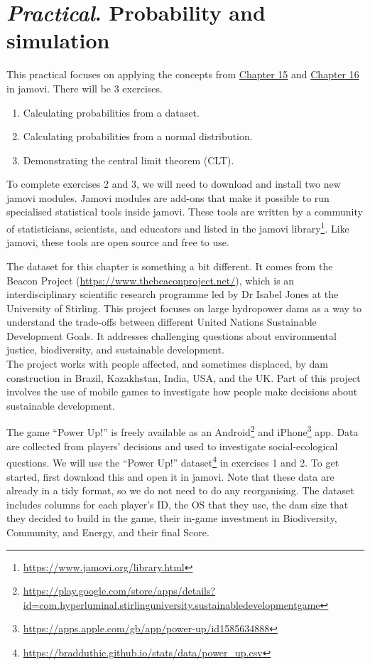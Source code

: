 \documentclass[
  openany]{krantz}
\providecommand{\tightlist}{%
  \setlength{\itemsep}{0pt}\setlength{\parskip}{0pt}}
\renewcommand{\href}[2]{#2\footnote{\url{#1}}}
\begin{document}
\hypertarget{Chapter_17}{%
\chapter{\texorpdfstring{\emph{Practical}. Probability and simulation}{Practical. Probability and simulation}}\label{Chapter_17}}

This practical focuses on applying the concepts from \protect\hyperlink{Chapter_15}{Chapter 15} and \protect\hyperlink{Chapter_16}{Chapter 16} in jamovi.
There will be 3 exercises.

\begin{enumerate}
\def\labelenumi{\arabic{enumi}.}
\tightlist
\item
  Calculating probabilities from a dataset.
\item
  Calculating probabilities from a normal distribution.
\item
  Demonstrating the central limit theorem (CLT).
\end{enumerate}

To complete exercises 2 and 3, we will need to download and install two new jamovi modules.
Jamovi modules are add-ons that make it possible to run specialised statistical tools inside jamovi.
These tools are written by a community of statisticians, scientists, and educators and listed in the \href{https://www.jamovi.org/library.html}{jamovi library}.
Like jamovi, these tools are open source and free to use.

The dataset for this chapter is something a bit different.
It comes from the Beacon Project (\url{https://www.thebeaconproject.net/}), which is an interdisciplinary scientific research programme led by Dr Isabel Jones at the University of Stirling.
This project focuses on large hydropower dams as a way to understand the trade-offs between different United Nations Sustainable Development Goals.
It addresses challenging questions about environmental justice, biodiversity, and sustainable development.\\
The project works with people affected, and sometimes displaced, by dam construction in Brazil, Kazakhstan, India, USA, and the UK.
Part of this project involves the use of mobile games to investigate how people make decisions about sustainable development.

The game ``Power Up!'' is freely available as an \href{https://play.google.com/store/apps/details?id=com.hyperluminal.stirlinguniversity.sustainabledevelopmentgame}{Android} and \href{https://apps.apple.com/gb/app/power-up/id1585634888}{iPhone} app.
Data are collected from players' decisions and used to investigate social-ecological questions.
We will use the ``Power Up!'' dataset\footnote{\url{https://bradduthie.github.io/stats/data/power_up.csv}} in exercises 1 and 2.
To get started, first download this and open it in jamovi.
Note that these data are already in a tidy format, so we do not need to do any reorganising.
The dataset includes columns for each player's ID, the OS that they use, the dam size that they decided to build in the game, their in-game investment in Biodiversity, Community, and Energy, and their final Score.
\end{document}
